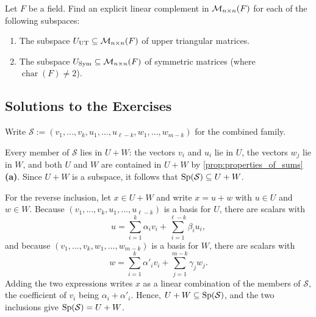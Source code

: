 \begin{exercise}
\label{exc:linear_complements_matrix_subspaces}
Let $F$ be a field. Find an explicit linear complement in $\mathcal{M}_{n \times n}(F)$ for each of the following subspaces:
\begin{enumerate}
    \item The subspace $U_{\mathrm{UT}} \subseteq \mathcal{M}_{n \times n}(F)$ of upper triangular matrices.
    \item The subspace $U_{\mathrm{Sym}} \subseteq \mathcal{M}_{n \times n}(F)$ of symmetric matrices (where $\operatorname{char}(F) \ne 2$).
\end{enumerate}
\end{exercise}

\subsection{Solutions to the Exercises}

\begin{exercisesolution}
\label{sol:combined_family_spans}
Write $\mathcal{S} := (v_1, \dots, v_k, u_1, \dots, u_{\ell-k}, w_1, \dots, w_{m-k})$ for the combined family.

Every member of $\mathcal{S}$ lies in $U + W$: the vectors $v_i$ and $u_i$ lie in $U$, the vectors $w_j$ lie in $W$, and both $U$ and $W$ are contained in $U + W$ by \cref{prop:properties_of_sums} \textbf{(a)}. Since $U + W$ is a subspace, it follows that $\operatorname{Sp}(\mathcal{S}) \subseteq U + W$.

For the reverse inclusion, let $x \in U + W$ and write $x = u + w$ with $u \in U$ and $w \in W$. Because $(v_1, \dots, v_k, u_1, \dots, u_{\ell-k})$ is a basis for $U$, there are scalars with
\[
u = \sum_{i=1}^{k} \alpha_i v_i + \sum_{i=1}^{\ell-k} \beta_i u_i,
\]
and because $(v_1, \dots, v_k, w_1, \dots, w_{m-k})$ is a basis for $W$, there are scalars with
\[
w = \sum_{i=1}^{k} \alpha'_i v_i + \sum_{j=1}^{m-k} \gamma_j w_j.
\]
Adding the two expressions writes $x$ as a linear combination of the members of $\mathcal{S}$, the coefficient of $v_i$ being $\alpha_i + \alpha'_i$. Hence, $U + W \subseteq \operatorname{Sp}(\mathcal{S})$, and the two inclusions give $\operatorname{Sp}(\mathcal{S}) = U + W$.
\end{exercisesolution}


